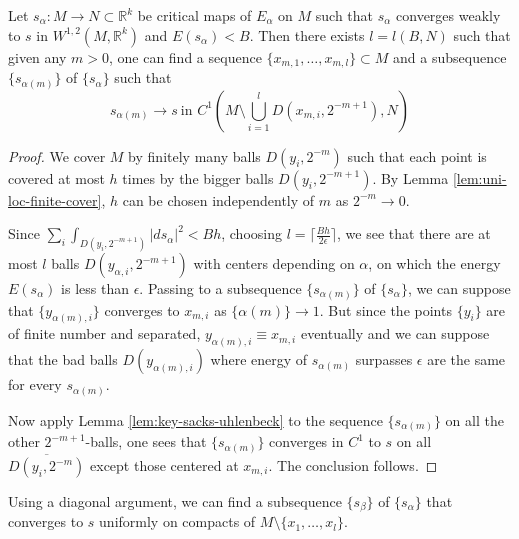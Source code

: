 \begin{proposition}
\label{prop:2-sacks-uhlenbeck}
Let \(s_\alpha:M \longrightarrow N\subset \mathbb{R}^k\) be critical maps of \(E_\alpha\) on \(M\) such that \(s_\alpha\) converges weakly to \(s\) in \(W^{1,2}(M,
\mathbb{R}^k)\) and \(E(s_\alpha) < B\). Then there exists \(l=l(B,N)\) such that given any \(m>0\),
one can find a sequence \(\{x_{m,1},\dots, x_{m,l}\}\subset M\) and a subsequence \(\{s_{\alpha(m)}\}\) of \(\{s_\alpha\}\) such that
\[
 s_{\alpha(m)} \longrightarrow  s\ \text{in } C^1\left(M\setminus\bigcup_{i=1}^{l} D(x_{m,i}, 2^{-m+1}),N\right)
\]
\end{proposition}
\begin{proof}
We cover \(M\) by finitely many balls \(D(y_i, 2^{-m})\) such that each point is covered
at most \(h\) times by the bigger balls \(D(y_i,2^{-m+1})\). By Lemma
\ref{lem:uni-loc-finite-cover}, \(h\) can be chosen independently of \(m\) as \(2^{-m} \to 0\).


Since \(\sum_i \int_{D(y_i, 2^{-m+1})} |ds_\alpha|^2 < B h\), choosing \(l = \lceil
\frac{Bh}{2\epsilon} \rceil\), we see that there are at most \(l\) balls \(D(y_{\alpha,i},
2^{-m+1})\) with centers depending on \(\alpha\), on which the energy \(E(s_\alpha)\) is less than
\(\epsilon\). Passing to a subsequence \(\{s_{\alpha(m)}\}\) of \(\{s_\alpha\}\),
we can suppose that \(\{y_{\alpha(m),i} \}\) converges to \(x_{m,i}\) as \(\{\alpha(m)\} \to 1\). But since the points \(\{y_i\}\) are of finite number and
separated, \(y_{\alpha(m),i}\equiv x_{m,i}\) eventually and we can suppose that the bad balls
\(D(y_{\alpha(m),i})\) where energy of \(s_{\alpha(m)}\) surpasses \(\epsilon\) are
the same for every \(s_{\alpha(m)}\).

Now apply Lemma \ref{lem:key-sacks-uhlenbeck} to the sequence \(\{s_{\alpha(m)}\}\) on all
the other \(2^{-m+1}\)-balls, one sees that \(\{s_{\alpha(m)}\}\) converges in \(C^1\) to \(s\) on all \(\overline{D(y_i, 2^{-m})}\) except those centered at \(x_{m,i}\). The conclusion follows.
\end{proof}

Using a diagonal argument, we can find a subsequence \(\{s_\beta\}\) of \(\{s_\alpha\}\) that converges to \(s\) uniformly on compacts of \(M\setminus \{x_1,\dots, x_l\}\).

